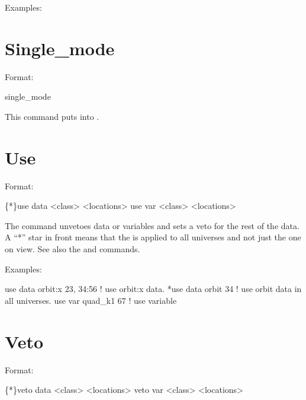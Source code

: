 Examples:

\section{Single_mode}
\label{s:singe_cmd}

Format:
\begin{example}
  single_mode
\end{example}

\vskip 0.2in 
This command puts \tao into . 

\section{Use}
\label{s:use}

Format:
\begin{example}
  \{*\}use data  <class> <locations>
  use var <class> <locations>
\end{example}

\vskip 0.2in 
The  command  unvetoes data or variables
and sets a veto for the rest of the data.
A ``*'' star in front means that the  is applied
to all universes and not just the one on view. See also the 
and  commands.

Examples:
\begin{example}
  use data orbit:x  23, 34:56 ! use orbit:x data.
  *use data orbit 34          ! use orbit data in all universes.
  use var quad_k1 67          ! use variable
\end{example}


\section{Veto}
\label{s:veto}

Format:
\begin{example}
  \{*\}veto data  <class> <locations>
  veto var <class> <locations>
\end{example}

